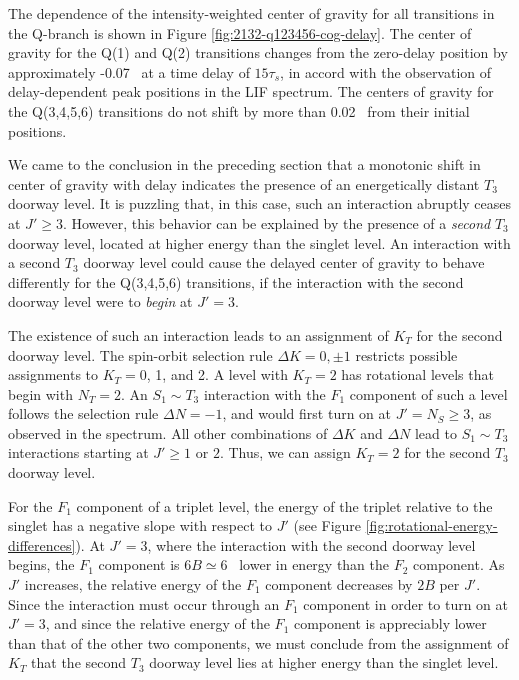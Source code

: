 The dependence of the intensity-weighted center of gravity for all
transitions in the Q-branch is shown in Figure
\ref{fig:2132-q123456-cog-delay}.  The center of gravity for the Q(1)
and Q(2) transitions changes from the zero-delay position by
approximately -0.07 \rcm\ at a time delay of $15\tau_s$, in accord
with the observation of delay-dependent peak positions in the LIF
spectrum.  The centers of gravity for the Q(3,4,5,6) transitions do
not shift by more than 0.02 \rcm\ from their initial positions.

We came to the conclusion in the preceding section that a monotonic
shift in center of gravity with delay indicates the presence of an
energetically distant $T_3$ doorway level.  It is puzzling that, in
this case, such an interaction abruptly ceases at $J' \geq 3$.
However, this behavior can be explained by the presence of a
\emph{second} $T_3$ doorway level, located at higher energy than the
singlet level.  An interaction with a second $T_3$ doorway level could
cause the delayed center of gravity to behave differently for the
Q(3,4,5,6) transitions, if the interaction with the second doorway
level were to \emph{begin} at $J'=3$.

The existence of such an interaction leads to an assignment of $K_T$
for the second doorway level.  The spin-orbit selection rule $\Delta K
= 0, \pm 1$ restricts possible assignments to $K_T=$0, 1, and 2.  A
level with $K_T=2$ has rotational levels that begin with $N_T=2$.  An
$S_1 \sim T_3$ interaction with the $F_1$ component of such a level
follows the selection rule $\Delta N = -1$, and would first turn on at
$J'=N_S \geq 3$, as observed in the spectrum.  All other combinations
of $\Delta K$ and $\Delta N$ lead to $S_1 \sim T_3$ interactions
starting at $J' \geq 1$ or $2$.  Thus, we can assign $K_T=2$ for the
second $T_3$ doorway level.

For the $F_1$ component of a triplet level, the energy of the triplet
relative to the singlet has a negative slope with respect to $J'$ (see
Figure \ref{fig:rotational-energy-differences}).  At $J'=3$, where the
interaction with the second doorway level begins, the $F_1$ component
is $6B \simeq 6$ \rcm\ lower in energy than the $F_2$ component.  As
$J'$ increases, the relative energy of the $F_1$ component decreases
by $2B$ per $J'$.  Since the interaction must occur through an $F_1$
component in order to turn on at $J'=3$, and since the relative energy
of the $F_1$ component is appreciably lower than that of the other two
components, we must conclude from the assignment of $K_T$ that the
second $T_3$ doorway level lies at higher energy than the singlet
level.


